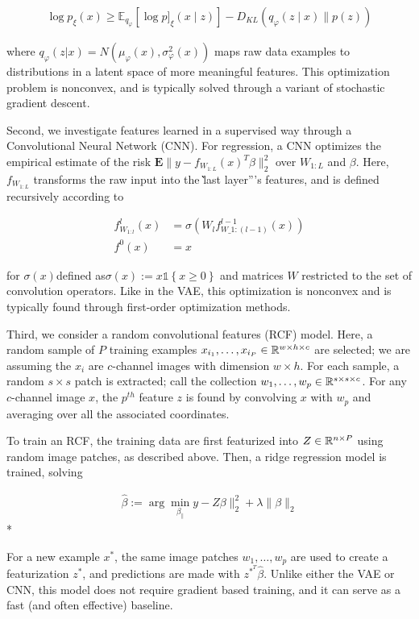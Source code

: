 \begin{align*}
\log p_{\xi}\left(x\right) \geq  \mathbb{E}_{q_{\varphi}}\left[\log p]_{\xi}(x \mid z)\right]-D_{KL}\left(q_{\varphi}(z \mid x) \| p(z)\right)
\end{align*}

where $q_{\varphi}\left(z \vert x\right) = N\left(\mu_{\varphi}\left(x\right), \sigma^{2}_{\varphi}\left(x\right)\right)$ maps raw data examples to distributions in a latent space of more meaningful features. This optimization problem is nonconvex, and is typically solved through a variant of stochastic gradient descent.

Second, we investigate features learned in a supervised way through a
Convolutional Neural Network (CNN). For regression, a CNN optimizes the
empirical estimate of the risk $\mathbf{E}\|y -
f_{W_{1:L}}\left(x\right)^{T}\beta\|_{2}^{2}$ over $W_{1:L}$ and $\beta$. Here,
$f_{W_{1:L}}$ transforms the raw input into the \`\`last layer''’s features, and
is defined recursively according to

\begin{align*}
f^{l}_{W_{1:l}}\left(x\right) &= \sigma\left(W_{l}f^{l - 1}_{W\_{1:(l - 1)}}\left(x\right)\right)\\
f^{0}\left(x\right) &= x
\end{align*}

for $\sigma\left(x\right)$defined as$\sigma\left(x\right) := x \mathbb{1}\left\{x \geq 0\right\}$ and matrices $W$ restricted to the set of convolution operators. Like in the VAE, this optimization is nonconvex and is typically found through first-order optimization methods.

Third, we consider a random convolutional features (RCF) model. Here, a random sample of $P$ training examples $x_{i_1}, \dots, x_{i_P} \in \mathbb{R}^{w \times h \times c}$ are selected; we are assuming the $x_{i}$ are $c$-channel images with dimension $w\times h$. For each sample, a random $s \times s$ patch is extracted; call the collection $w_{1}, \dots, w_{p} \in \mathbb{R}^{s \times s \times c}$. For any $c$-channel image $x$, the $p^{th}$ feature $z$ is found by convolving $x$ with $w_{p}$ and averaging over all the associated coordinates.

To train an RCF, the training data are first featurized into $Z \in \mathbb{R}^{n \times P}$ using random image patches, as described above. Then, a ridge regression model is trained, solving

\begin{align*}
\hat{\beta} := \arg \min_{\beta} _\|y - Z\beta\|_{2}^{2} + \lambda \|\beta\|_{2}
\end{align*}*

For a new example $x^{\ast}$, the same image patches $w_{1}, \dots, w_{p}$ are used to create a featurization $z^{\ast}$, and predictions are made with $z^{\ast}^{T}\hat{\beta}$. Unlike either the VAE or CNN, this model does not require gradient based training, and it can serve as a fast (and often effective) baseline.
